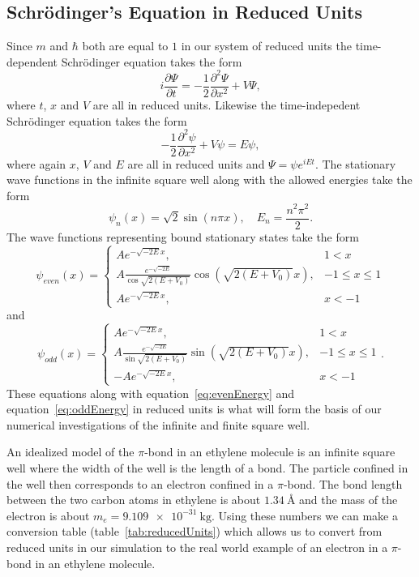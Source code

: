 \documentclass[12pt,a4paper]{article}
\newcommand{\pdiff}[2]{\frac{\partial #1}{\partial #2}}
\newcommand{\pdiffn}[3]{\frac{\partial^{#3} #1}{\partial #2^{#3}}}
\begin{document}
\subsection{Schrödinger's Equation in Reduced Units}
Since $m$ and $\hbar$ both are equal to $1$ in our system of reduced units the time-dependent Schrödinger equation takes the form
\begin{equation}
i \pdiff{\Psi}{t} = - \frac{1}{2} \pdiffn{\Psi}{x}{2} + V \Psi,
\end{equation}
where $t$, $x$ and $V$ are all in reduced units. Likewise the time-indepedent Schrödinger equation takes the form
\begin{equation}
- \frac{1}{2} \pdiffn{\psi}{x}{2} + V \psi = E \psi,
\end{equation}
where again $x$, $V$ and $E$ are all in reduced units and $\Psi = \psi e^{i E t}$. The stationary wave functions in the infinite square well along with the allowed energies take the form
\begin{equation}
\psi_n(x) = \sqrt{2} \sin (n \pi x), \quad E_n = \frac{n^2 \pi^2}{2}.
\end{equation}
The wave functions representing bound stationary states take the form
\begin{equation}
\psi_{even}(x) = \begin{cases} A e^{-\sqrt{-2 E} x}, & 1 < x \\
                               A \frac{e^{-\sqrt{-2 E}}}{\cos \sqrt{2(E + V_0)}} \cos \left( \sqrt{2(E + V_0)} x \right), & -1 \leq x \leq 1 \\
                               A e^{-\sqrt{-2 E} x}, & x < -1 \end{cases}
\end{equation}
and
\begin{equation}
\psi_{odd}(x) = \begin{cases} A e^{-\sqrt{-2 E} x}, & 1 < x \\
                              A \frac{e^{-\sqrt{-2 E}}}{\sin \sqrt{2(E + V_0)}} \sin \left( \sqrt{2(E + V_0)} x \right), & -1 \leq x \leq 1 \\
                              -A e^{-\sqrt{-2 E} x}, & x < -1 \end{cases}.
\end{equation}
These equations along with equation~\eqref{eq:evenEnergy} and equation~\eqref{eq:oddEnergy} in reduced units is what will form the basis of our numerical investigations of the infinite and finite square well.

An idealized model of the $\pi$-bond in an ethylene molecule is an infinite square well where the width of the well is the length of a bond. The particle confined in the well then corresponds to an electron confined in a $\pi$-bond. The bond length between the two carbon atoms in ethylene is about $\SI{1.34}{\angstrom}$ and the mass of the electron is about $m_e = \SI{9.109e-31}{\kilo\gram}$. Using these numbers we can make a conversion table (table~\ref{tab:reducedUnits}) which allows us to convert from reduced units in our simulation to the real world example of an electron in a $\pi$-bond in an ethylene molecule.
\end{document}

